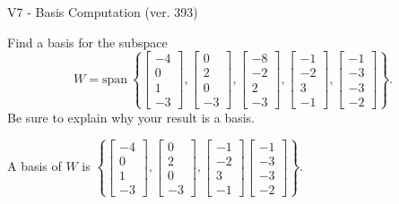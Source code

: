 \begin{exercise}
  \begin{exerciseTitle}V7 - Basis Computation (ver. 393)\end{exerciseTitle}
  \begin{exerciseStatement}
    Find a basis for the subspace 
\[W=\mathrm{span}\ \left\{\left[\begin{array}{r}
-4 \\
0 \\
1 \\
-3
\end{array}\right] , \left[\begin{array}{r}
0 \\
2 \\
0 \\
-3
\end{array}\right] , \left[\begin{array}{r}
-8 \\
-2 \\
2 \\
-3
\end{array}\right] , \left[\begin{array}{r}
-1 \\
-2 \\
3 \\
-1
\end{array}\right] , \left[\begin{array}{r}
-1 \\
-3 \\
-3 \\
-2
\end{array}\right]\right\}.\]
 Be sure to explain why your result is a basis.


  \end{exerciseStatement}
  \begin{exerciseAnswer}
   A basis of \(W\) is  \(\left\{\left[\begin{array}{r}
-4 \\
0 \\
1 \\
-3
\end{array}\right] , \left[\begin{array}{r}
0 \\
2 \\
0 \\
-3
\end{array}\right] , \left[\begin{array}{r}
-1 \\
-2 \\
3 \\
-1
\end{array}\right] \left[\begin{array}{r}
-1 \\
-3 \\
-3 \\
-2
\end{array}\right]\right\}\).
  


  \end{exerciseAnswer}
\end{exercise}